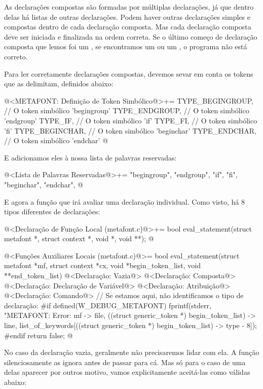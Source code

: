 As declarações compostas são formadas por múltiplas declarações, já
que dentro delas há listas de outras declarações. Podem haver outras
declarações simples e compostas dentro de cada declaração
composta. Mas cada declaração composta deve ser iniciada e finalizada
na ordem correta. Se o último começo de declaração composta que lemos
foi um , se encontramos um  ou
um , o programa não está correto.

Para ler corretamente declarações compostas, devemos sevar em conta os
tokens que as delimitam, definidos abaixo:

\iniciocodigo
@<METAFONT: Definição de Token Simbólico@>+=
TYPE_BEGINGROUP,            // O token simbólico 'begingroup'
TYPE_ENDGROUP,              // O token simbólico 'endgroup'
TYPE_IF,                    // O token simbólico 'if'
TYPE_FI,                    // O token simbólico 'fi'
TYPE_BEGINCHAR,             // O token simbólico 'beginchar'
TYPE_ENDCHAR,               // O token simbólico 'endchar'
@
\fimcodigo

E adicionamos eles à nossa lista de palavras reservadas:

\iniciocodigo
@<Lista de Palavras Reservadas@>+=
"begingroup", "endgroup", "if", "fi", "beginchar", "endchar",
@
\fimcodigo

E agora a função que irá avaliar uma declaração individual. Como
visto, há 8 tipos diferentes de declarações:

\iniciocodigo
@<Declaração de Função Local (metafont.c)@>+=
bool eval_statement(struct metafont *, struct context *, void *, void **);
@
\fimcodigo

\iniciocodigo
@<Funções Auxiliares Locais (metafont.c)@>=
bool eval_statement(struct metafont *mf, struct context *cx,
                     void *begin_token_list, void **end_token_list){
  @<Declaração: Vazia@>
  @<Declaração: Composta@>
  @<Declaração: Declaração de Variável@>
  @<Declaração: Atribuição@>
  @<Declaração: Comando@>
  // Se estamos aqui, não identificamos o tipo de declaração:
#if defined(W_DEBUG_METAFONT)
    fprintf(stderr, "METAFONT: Error: %
            mf -> file,
            ((struct generic_token *) begin_token_list) -> line,
            list_of_keywords[((struct generic_token *) begin_token_list) -> type - 8]);
#endif
  return false;
}
@
\fimcodigo

No caso da declaração vazia, geralmente não precisaremos lidar com
ela. A função  silenciosamente
as ignora antes de passar para cá. Mas só para o caso de uma delas
aparecer por outros motivo, vamos explicitamente aceitá-las como
válidas abaixo:

